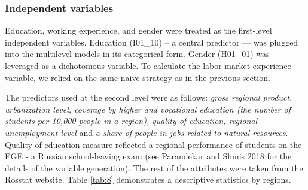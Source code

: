 \documentclass[12pt,a4paper]{article}
\numberwithin{equation}{section}
\begin{document}
\subsubsection*{Independent variables}
Education, working experience, and gender were treated as the first-level independent variables. Education (I01\_10) -- a central predictor --- was plugged into the multilevel models in its categorical form. Gender (H01\_01) was leveraged as a dichotomous variable. To calculate the labor market experience variable, we relied on the same naive strategy as in the previous section.

The predictors used at the second level were as follows: \textit{gross regional product, urbanization level, coverage by higher and vocational education (the number of students per 10,000 people in a region), quality of education, regional unemployment level} and \textit{a share of people in jobs related to natural resources}. Quality of education measure reflected a regional performance of students on the EGE - a Russian school-leaving exam (see Parandekar and Shmis 2018 for the details of the variable generation). The rest of the attributes were taken from the Rosstat website. Table \ref{tab:8} demonstrates a descriptive statistics by regions.
\end{document}
